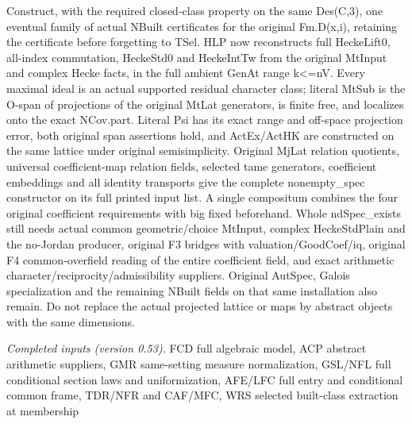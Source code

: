 Construct, with the required closed-class property on the same Des(C,3), one eventual family of actual NBuilt certificates for the original Fm.D(x,i), retaining the certificate before forgetting to TSel. HLP now reconstructs full HeckeLift0, all-index commutation, HeckeStd0 and HeckeIntTw from the original MtInput and complex Hecke facts, in the full ambient GenAt range k<=nV. Every maximal ideal is an actual supported residual character class; literal MtSub is the O-span of projections of the original MtLat generators, is finite free, and localizes onto the exact NCov.part. Literal Psi has its exact range and off-space projection error, both original span assertions hold, and ActEx/ActHK are constructed on the same lattice under original semisimplicity. Original MjLat relation quotients, universal coefficient-map relation fields, selected tame generators, coefficient embeddings and all identity transports give the complete nonempty\_\allowbreak spec constructor on its full printed input list. A single compositum combines the four original coefficient requirements with big fixed beforehand. Whole ndSpec\_\allowbreak exists still needs actual common geometric/choice MtInput, complex HeckeStdPlain and the no-Jordan producer, original F3 bridges with valuation/GoodCoef/iq, original F4 common-overfield reading of the entire coefficient field, and exact arithmetic character/reciprocity/admissibility suppliers. Original AutSpec, Galois specialization and the remaining NBuilt fields on that same installation also remain. Do not replace the actual projected lattice or maps by abstract objects with the same dimensions.

\emph{Completed inputs (version 0.53).} FCD full algebraic model, ACP abstract arithmetic suppliers, GMR same-setting measure normalization, GSL/NFL full conditional section laws and uniformization, AFE/LFC full entry and conditional common frame, TDR/NFR and CAF/MFC, WRS selected built-class extraction at membership

